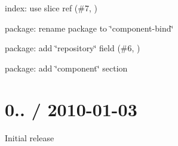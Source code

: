 
\begin{DoxyItemize}
\item index\+: use slice ref (\#7, )
\item package\+: rename package to \char`\"{}component-\/bind\char`\"{}
\item package\+: add \char`\"{}repository\char`\"{} field (\#6, )
\item package\+: add \char`\"{}component\char`\"{} section
\end{DoxyItemize}

\section*{0.. / 2010-\/01-\/03 }


\begin{DoxyItemize}
\item Initial release 
\end{DoxyItemize}
